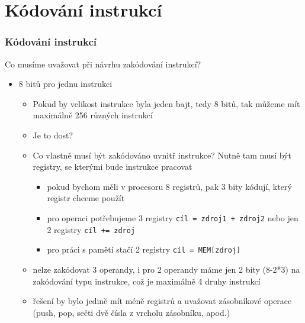 \documentclass{beamer}
\begin{document}
\section{Kódování instrukcí}

\begin{frame}
\frametitle{Kódování instrukcí}

Co musíme uvažovat při návrhu zakódování instrukcí?
\begin{itemize}
\item 8 bitů pro jednu instrukci
\begin{itemize}
\item Pokud by velikost instrukce byla jeden bajt, tedy 8 bitů, tak můžeme mít maximálně 256 různých instrukcí
\item Je to dost?
\item Co vlastně musí být zakódováno uvnitř instrukce? Nutně tam musí být registry, se kterými bude instrukce pracovat
\begin{itemize}
\item pokud bychom měli v procesoru 8 registrů, pak 3 bity kódují, který registr chceme použít
\item pro operaci potřebujeme 3 registry \texttt{cíl = zdroj1 + zdroj2} nebo jen 2 registry \texttt{cíl += zdroj}
\item pro práci s pamětí stačí 2 registry \texttt{cíl = MEM[zdroj]}
\end{itemize}
\item nelze zakódovat 3 operandy, i pro 2 operandy máme jen 2 bity (8-2*3) na zakódování typu instrukce, což je maximálně 4 druhy instrukcí
\item řešení by bylo jedině mít méně registrů a uvažovat zásobníkové operace (push, pop, sečti dvě čísla z vrcholu zásobníku, apod.)
\end{itemize}
\end{itemize}
\end{frame}
\end{document}
